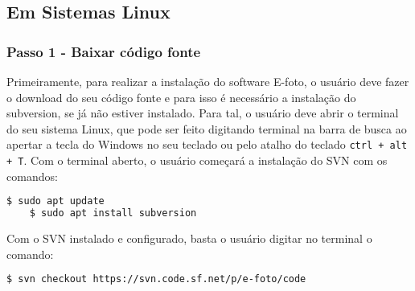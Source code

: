 \subsection{Em Sistemas Linux}

\subsubsection{Passo 1 - Baixar código fonte}
Primeiramente, para realizar a instalação do software E-foto, o usuário deve fazer o download do seu código fonte e para isso é necessário a instalação do subversion, se já não estiver instalado. Para tal, o usuário deve abrir o terminal do seu sistema Linux, que pode ser feito digitando terminal na barra de busca ao apertar a tecla do Windows no seu teclado ou pelo atalho do teclado \texttt{ctrl + alt + T}. Com o terminal aberto, o usuário começará a instalação do SVN com os comandos: 
\begin{lstlisting}[language=bash]
	$ sudo apt update
	$ sudo apt install subversion
\end{lstlisting}
 
Com o SVN instalado e configurado, basta o usuário digitar no terminal o comando:
\begin{lstlisting}[language=bash]
 $ svn checkout https://svn.code.sf.net/p/e-foto/code
\end{lstlisting}

